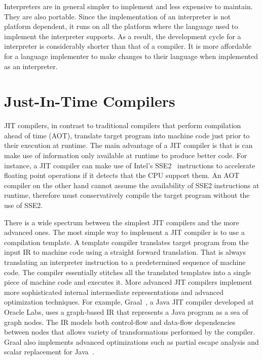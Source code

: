 Interpreters are in general simpler to implement and less expensive to maintain.
They are also portable.
Since the implementation of an interpreter is not platform dependent, it runs on all the platform where the language used to implement the interpreter supports.
As a result, the development cycle for a interpreter is considerably shorter than that of a compiler.
It is more affordable for a language implementer to make changes to their language when implemented as an interpreter.

\section{Just-In-Time Compilers}

JIT compilers, in contrast to traditional compilers that perform compilation ahead of time (AOT), translate target program into machine code just prior to their execution at runtime.
The main advantage of a JIT compiler is that is can make use of information only available at runtime to produce better code.
For instance, a JIT compiler can make use of Intel's SSE2~\cite{klimovitski2001using} instructions to accelerate floating point operations if it detects that the CPU support them.
An AOT compiler on the other hand cannot assume the availability of SSE2 instructions at runtime, therefore must conservatively compile the target program without the use of SSE2.

There is a wide spectrum between the simplest JIT compilers and the more advanced ones.
The most simple way to implement a JIT compiler is to use a compilation template.
A template compiler translates target program from the input IR to machine code using a straight forward translation.
That is always translating an interpreter instruction to a predetermined sequence of machine code.
The compiler essentially stitches all the translated templates into a single piece of machine code and executes it.
More advanced JIT compilers implement more sophisticated internal intermediate representations and advanced optimization techniques.
For example, Graal~\cite{duboscq2013graal}, a Java JIT compiler developed at Oracle Labs, uses a graph-based IR that represents a Java program as a sea of graph nodes.
The IR models both control-flow and data-flow dependencies between nodes that allows variety of transformations performed by the compiler.
Graal also implements advanced optimizations such as partial escape analysis and scalar replacement for Java~\cite{stadler2014partial}.

